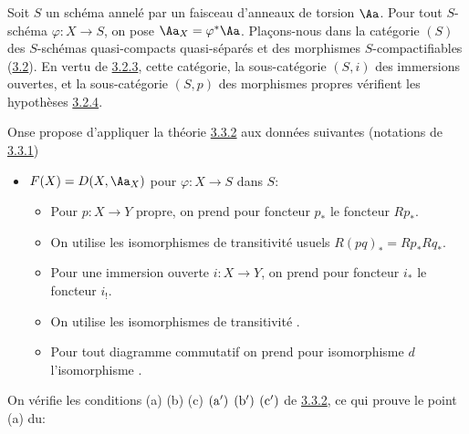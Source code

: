 \documentclass[10pt]{../fichiers-configuration-latex/smfart}
\begin{document}
\setcounter{subsubsection}{6}
\subsubsection{}
Soit $S$ un schéma annelé par un faisceau d'anneaux de torsion
$\Aa$. Pour tout $S$-schéma $\varphi:X\rightarrow S$, on pose
$\Aa_X=\varphi^{\ast}\Aa$. Plaçons-nous dans la catégorie $(S)$ des
$S$-schémas quasi-compacts quasi-séparés et des morphismes
$S$-compactifiables (\hyperref[XVII.subsec3.2]{3.2}). En vertu de
\hyperref[XVII.prop3.2.3]{3.2.3}, cette catégorie, la sous-catégorie $(S,i)$ des
immersions ouvertes, et la sous-catégorie $(S,p)$ des morphismes
propres vérifient les hypothèses \hyperref[XVII.subsubsec3.2.4]{3.2.4}.

On\pageoriginale se propose d'appliquer la théorie \hyperref[XVII.prop3.3.2]{3.3.2} aux données
suivantes (notations de \hyperref[XVII.subsubsec3.3.1]{3.3.1})

\begin{itemize}
\item[$\alpha$)] $F(X)=D(X,\Aa_X)$ pour $\varphi:X\rightarrow
S$ dans $S$:
\begin{itemize}
\item[(i)] Pour $p:X\rightarrow Y$ propre, on prend pour foncteur
$p_{\ast}$ le foncteur $Rp_{\ast}$.

\item[(ii)] On utilise les isomorphismes de transitivité usuels
$R(pq)_{\ast}=Rp_{\ast}Rq_{\ast}$.

\item[${\rm(i')}$] Pour une immersion ouverte $i:X\rightarrow Y$, on
prend pour foncteur $i_{\ast}$ le foncteur $i_{!}$.

\item[${\rm(ii')}$] On utilise les isomorphismes de transitivité
.

\item[${\rm(iii)}$] Pour tout diagramme commutatif  on prend
pour isomorphisme $d$ l'isomorphisme .
\end{itemize}
\end{itemize}

On vérifie les conditions (a) (b) (c) ${\rm(a')}$ ${\rm(b')}$
${\rm(c')}$ de \hyperref[XVII.prop3.3.2]{3.3.2}, ce qui prouve le point (a) du:
\end{document}
